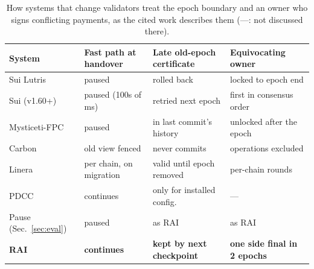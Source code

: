 \begin{table}[t]
\caption{How systems that change validators treat the epoch boundary and an owner who signs conflicting payments, as the cited work describes them (---: not discussed there).}
\label{tab:related}
\centering
\footnotesize
\setlength{\tabcolsep}{2.5pt}
\renewcommand{\arraystretch}{1.08}
\begin{tabularx}{\columnwidth}{@{}l>{\raggedright\arraybackslash}X>{\raggedright\arraybackslash}X>{\raggedright\arraybackslash}X@{}}
\toprule
System & Fast path at handover & Late old-epoch certificate & Equivocating owner \\
\midrule
Sui Lutris~\cite{lutris} & paused & rolled back & locked to epoch end \\
Sui (v1.60+)~\cite{suimysticetiv2,sui2026epochs} & paused (100s of ms) & retried next epoch & first in consensus order \\
Mysticeti-FPC~\cite{babel2025mysticeti} & paused & in last commit's history & unlocked after the epoch \\
Carbon~\cite{camaioni2024carbon} & old view fenced & never commits & operations excluded \\
Linera~\cite{linera2026docs,linera2026execution} & per chain, on migration & valid until epoch removed & per-chain rounds \\
PDCC~\cite{pdcc} & continues & only for installed config. & --- \\
Pause (Sec.~\ref{sec:eval}) & paused & as RAI & as RAI \\
\textbf{RAI} & \textbf{continues} & \textbf{kept by next checkpoint} & \textbf{one side final in 2 epochs} \\
\bottomrule
\end{tabularx}
\end{table}
